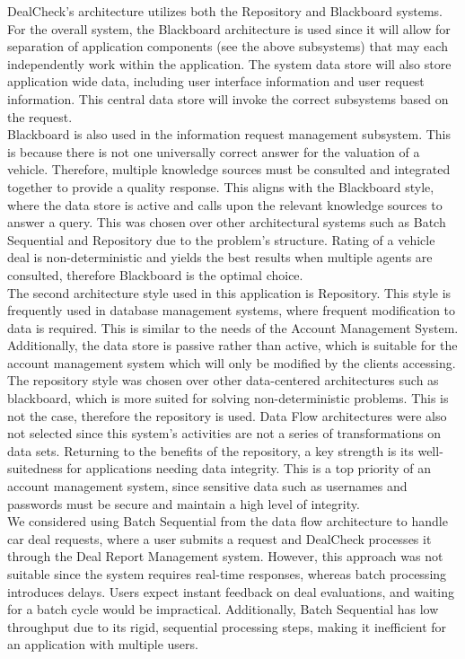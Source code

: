 \documentclass[]{article}
\begin{document}
DealCheck’s architecture utilizes both the Repository and Blackboard systems. For the overall system, the Blackboard architecture is used since it will allow for separation of application components (see the above subsystems) that may each independently work within the application. The system data store will also store application wide data, including user interface information and user request information. This central data store will invoke the correct subsystems based on the request. \\

Blackboard is also used in the information request management subsystem. This is because there is not one universally correct answer for the valuation of a vehicle. Therefore, multiple knowledge sources must be consulted and integrated together to provide a quality response. This aligns with the Blackboard style, where the data store is active and calls upon the relevant knowledge sources to answer a query. This was chosen over other architectural systems such as Batch Sequential and Repository due to the problem’s structure. Rating of a vehicle deal is non-deterministic and yields the best results when multiple agents are consulted, therefore Blackboard is the optimal choice.\\

The second architecture style used in this application is Repository. This style is frequently used in database management systems, where frequent modification to data is required. This is similar to the needs of the Account Management System. Additionally, the data store is passive rather than active, which is suitable for the account management system which will only be modified by the clients accessing. The repository style was chosen over other data-centered architectures such as blackboard, which is more suited for solving non-deterministic problems. This is not the case, therefore the repository is used. Data Flow architectures were also not selected since this system’s activities are not a series of transformations on data sets. Returning to the benefits of the repository, a key strength is its well-suitedness for applications needing data integrity. This is a top priority of an account management system, since sensitive data such as usernames and passwords must be secure and maintain a high level of integrity.\\

We considered using Batch Sequential from the data flow architecture to handle car deal requests, where a user submits a request and DealCheck processes it through the Deal Report Management system. However, this approach was not suitable since the system requires real-time responses, whereas batch processing introduces delays. Users expect instant feedback on deal evaluations, and waiting for a batch cycle would be impractical. Additionally, Batch Sequential has low throughput due to its rigid, sequential processing steps, making it inefficient for an application with multiple users.\\
\end{document}
